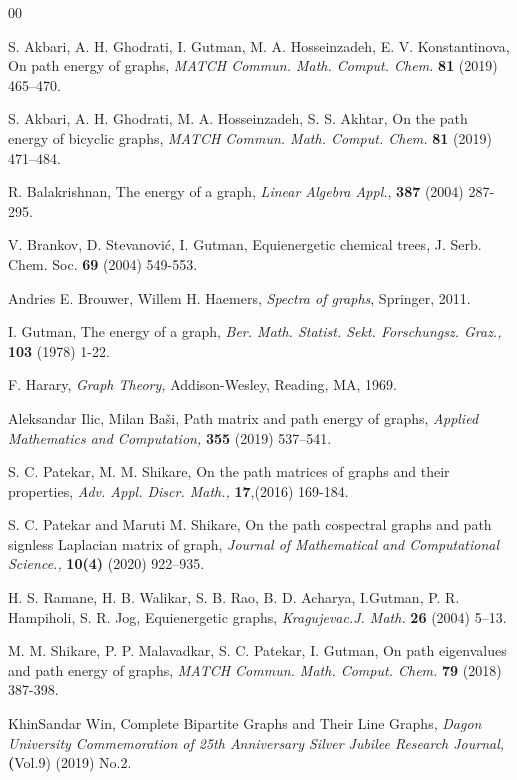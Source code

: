 \documentclass{article}
\newtheorem*{open problem*}{Open Problem}
\begin{document}
	
	\begin{thebibliography}{00}
		
		 S. Akbari, A. H. Ghodrati, I. Gutman, M. A. Hosseinzadeh, E. V. Konstantinova, On path energy of graphs, \textit{MATCH Commun. Math. Comput. Chem.\/} \textbf{81} (2019) 465–470.
		
		  S. Akbari, A. H. Ghodrati, M. A. Hosseinzadeh, S. S. Akhtar, On the path energy of bicyclic graphs, \textit{MATCH Commun. Math. Comput. Chem.\/} \textbf{81} (2019) 471–484.
		
		R. Balakrishnan, The energy of a graph, \textit{Linear Algebra Appl.}, \textbf{387} (2004) 287-295.
		
		V. Brankov, D. Stevanovi\'c, I. Gutman, Equienergetic chemical trees, J. Serb. Chem. Soc. \textbf{69} (2004) 549-553.
		
		 Andries E. Brouwer, Willem H. Haemers, \textit{Spectra of graphs\/}, Springer, 2011.
		
		 I. Gutman, The energy of a graph, \textit{Ber. Math. Statist. Sekt. Forschungsz. Graz.,} \textbf{103} (1978) 1-22.
		
		 F. Harary, \textit{Graph Theory,} Addison-Wesley, Reading, MA, 1969.
		
		 Aleksandar Ilic, Milan Baši, Path matrix and path energy of graphs, \textit{Applied Mathematics and Computation,} \textbf{355} (2019) 537–541.
		
		 S. C. Patekar, M. M. Shikare, On the path matrices of graphs and their properties, \textit{Adv. Appl. Discr. Math.,} \textbf{17},(2016) 169-184.
		
		S. C. Patekar and Maruti M. Shikare, On the path cospectral graphs and path signless Laplacian matrix of graph, \textit{Journal of Mathematical and Computational Science.,} \textbf{10(4)} (2020) 922–935.
		
		H. S. Ramane, H. B. Walikar, S. B. Rao, B. D. Acharya, I.Gutman, P. R. Hampiholi, S. R. Jog, Equienergetic graphs, \textit{Kragujevac.J. Math.} \textbf{26} (2004) 5–13.
		
		M. M. Shikare, P. P. Malavadkar, S. C. Patekar, I. Gutman, On path eigenvalues and path energy of graphs, \textit{MATCH Commun. Math. Comput. Chem.\/} \textbf{79} (2018) 387-398.
		
		KhinSandar Win, Complete Bipartite Graphs and Their Line Graphs, \textit{Dagon University Commemoration of 25th Anniversary Silver Jubilee Research Journal,} \textbf(Vol.9) (2019) No.2.
	\end{thebibliography}
	
	
\end{document}
